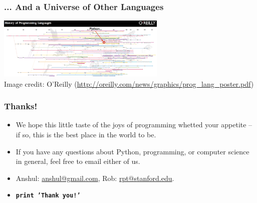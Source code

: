 \documentclass[10pt]{beamer}
\begin{document}
\begin{frame}
  \frametitle{... And a Universe of Other Languages}
  \begin{center}
    \includegraphics[width=305px]{ProgrammingLanguagesPoster-AnnotatedCropped.png} \\
    \tiny 
    Image credit: O'Reilly (\href{http://oreilly.com/news/graphics/prog\_lang\_poster.pdf}{http://oreilly.com/news/graphics/prog\_lang\_poster.pdf})
  \end{center}
\end{frame}

\begin{frame}
  \frametitle{Thanks!}
  \begin{itemize}
    \item We hope this little taste of the joys of programming whetted your appetite -- if so, this is the best place in the world to be.
    \item If you have any questions about Python, programming, or computer science in general, feel free to email either of us.
    \item Anshul: \href{mailto:anshul@gmail.com}{anshul@gmail.com}, Rob: \href{mailto:rpt@stanford.edu}{rpt@stanford.edu}.
    \item \texttt{\textbf{print 'Thank you!'}}
  \end{itemize}
\end{frame}
\end{document}
